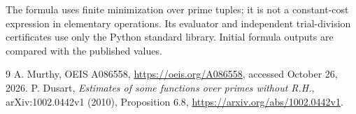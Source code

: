 \documentclass[10pt]{article}
\begin{document}
The formula uses finite minimization over prime tuples; it is not a
constant-cost expression in elementary operations. Its evaluator and
independent trial-division certificates use only the Python standard
library. Initial formula outputs are compared with the published values.

\begin{thebibliography}{9}
 A. Murthy, OEIS A086558,
\url{https://oeis.org/A086558}, accessed October 26, 2026.
 P. Dusart, \emph{Estimates of some functions over primes
without R.H.}, arXiv:1002.0442v1 (2010), Proposition 6.8,
\url{https://arxiv.org/abs/1002.0442v1}.
\end{thebibliography}
\end{document}
